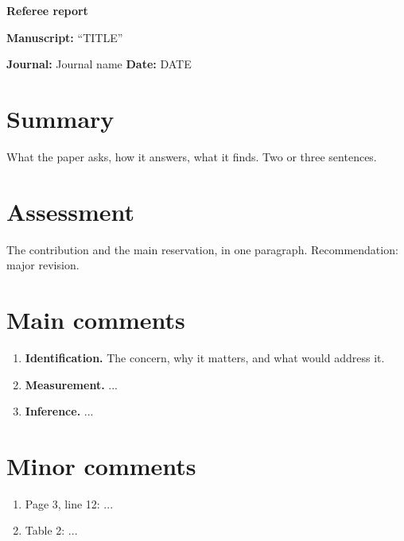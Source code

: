 \documentclass[11pt,a4paper]{article}
\begin{document}
{\Large\bfseries Referee report}\par
\textbf{Manuscript:} ``{{TITLE}}''\par
\textbf{Journal:} Journal name \quad \textbf{Date:} {{DATE}}

\section*{Summary}
What the paper asks, how it answers, what it finds. Two or three sentences.

\section*{Assessment}
The contribution and the main reservation, in one paragraph. Recommendation: major revision.

\section*{Main comments}
\begin{enumerate}[label=\textbf{\arabic*.},leftmargin=*]
  \item \textbf{Identification.} The concern, why it matters, and what would address it.
  \item \textbf{Measurement.} ...
  \item \textbf{Inference.} ...
\end{enumerate}

\section*{Minor comments}
\begin{enumerate}[label=\arabic*.,leftmargin=*]
  \item Page 3, line 12: ...
  \item Table 2: ...
\end{enumerate}
\end{document}
